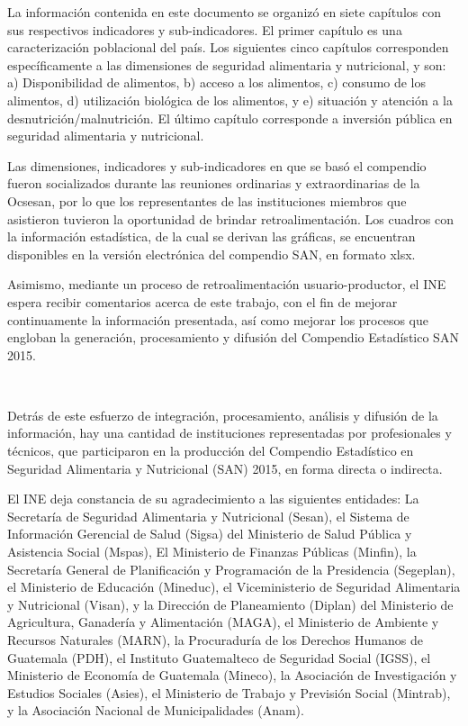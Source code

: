 La información contenida en este documento se organizó en siete capítulos con sus respectivos indicadores y sub-indicadores. El primer capítulo es una caracterización poblacional del país. Los siguientes cinco capítulos corresponden específicamente a las dimensiones de seguridad alimentaria y nutricional, y son: a) Disponibilidad de alimentos, b) acceso a los alimentos, c) consumo de los alimentos, d) utilización biológica de los alimentos, y e) situación y atención a la desnutrición/malnutrición. El último capítulo corresponde a  inversión pública en seguridad alimentaria y nutricional. 

Las dimensiones, indicadores y sub-indicadores en que se basó el compendio fueron socializados durante las reuniones ordinarias y extraordinarias de la Ocsesan, por lo que los representantes de las instituciones miembros que asistieron tuvieron la oportunidad de brindar retroalimentación. Los cuadros con la información estadística, de la cual se derivan las gráficas, se encuentran disponibles en la versión electrónica del compendio SAN, en formato xlsx.

Asimismo, mediante un proceso de retroalimentación usuario-productor, el INE espera recibir comentarios acerca de este trabajo, con el fin de mejorar continuamente la información presentada, así como mejorar los procesos que engloban la generación, procesamiento y difusión del Compendio Estadístico SAN 2015.


$\ $

\cleardoublepage
	


\indent{}
\\


Detrás de este esfuerzo de integración, procesamiento, análisis y difusión de la información, hay una cantidad de instituciones representadas por profesionales y técnicos, que participaron en la producción del Compendio Estadístico en Seguridad Alimentaria y Nutricional (SAN) 2015, en forma directa o indirecta.

El INE deja constancia de su agradecimiento a las siguientes entidades: La Secretaría de Seguridad Alimentaria y Nutricional (Sesan), el Sistema de Información Gerencial de Salud (Sigsa) del Ministerio de Salud Pública y Asistencia Social (Mspas), El Ministerio de Finanzas Públicas (Minfin), la Secretaría General de Planificación y Programación de la Presidencia (Segeplan), el Ministerio de Educación (Mineduc), el Viceministerio de Seguridad Alimentaria y Nutricional (Visan), y la Dirección de Planeamiento (Diplan) del Ministerio de Agricultura, Ganadería y Alimentación (MAGA), el Ministerio de Ambiente y Recursos Naturales (MARN), la Procuraduría de los Derechos Humanos de Guatemala (PDH), el Instituto Guatemalteco de Seguridad Social (IGSS), el Ministerio de Economía de Guatemala (Mineco), la Asociación de Investigación y Estudios Sociales (Asies), el Ministerio de Trabajo y Previsión Social (Mintrab), y la Asociación Nacional de Municipalidades (Anam).

